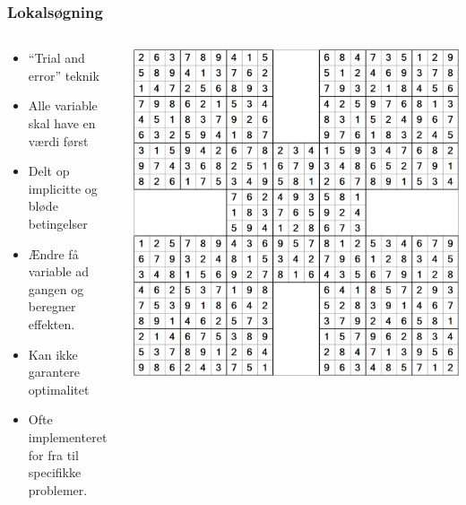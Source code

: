 \documentclass[smaller]{beamer}
\begin{document}
\begin{frame}
\frametitle{Lokalsøgning}
\begin{columns}[T]
    \begin{column}[T]{.5\textwidth}\begin{itemize}[<+->]
\item ``Trial and error'' teknik
\item Alle variable skal have en værdi først
\item Delt op implicitte og bløde betingelser
\item Ændre få variable ad gangen og beregner effekten.
\item Kan ikke garantere optimalitet
\item Ofte implementeret for fra til specifikke problemer.
\end{itemize}
\end{column} 
\begin{column}[T]{.5\textwidth} \vfill
\includegraphics[scale=0.2]{lokals5.png}
\end{column}
\end{columns}
\end{frame}
\end{document}

